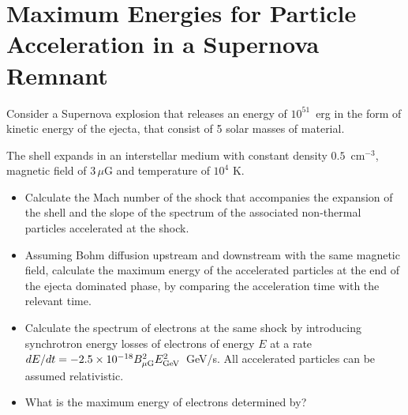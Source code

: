 \section{Maximum Energies for Particle Acceleration in a Supernova Remnant}

Consider a Supernova explosion that releases an energy of $10^{51}$~erg in the form of kinetic energy of the ejecta, that consist of 5 solar masses of material. 

The shell expands in an interstellar medium with constant density $0.5$~cm$^{-3}$, magnetic field of $3\, \mu$G and temperature of $10^4$ K. 

\begin{itemize}
\item Calculate the Mach number of the shock that accompanies the expansion of the shell and the slope of the spectrum of
the associated non-thermal particles accelerated at the shock. 
\item Assuming Bohm diffusion upstream and downstream with the same magnetic field, calculate the maximum energy of the accelerated particles at the end of the ejecta dominated phase, by comparing the acceleration time with the
relevant time. 
\item Calculate the spectrum of electrons at the same shock by introducing synchrotron energy losses of electrons of energy $E$ at a rate \( dE/dt=-2.5 \times 10^{-18} B_{\mu \text{G}}^2 E_{\rm GeV}^2 \)~GeV/s. All accelerated particles can be assumed relativistic.
\item What is the maximum energy of electrons
determined by?
\end{itemize}